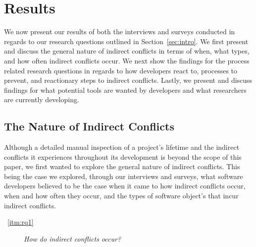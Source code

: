 \documentclass[conference]{IEEEtran}
\begin{document}
\section{Results}
\label{sec:results}

We now present our results of both the interviews and surveys conducted in regards to our research questions
outlined in Section~\ref{sec:intro}. We first present and discuss the general nature of indirect conflicts in
terms of when, what types, and how often indirect conflicts occur. We next show the findings for the process
related research questions in regards to how developers react to, processes to prevent, and reactionary steps
to indirect conflicts. Lastly, we present and discuss findings for what potential tools are wanted by developers
and what researchers are currently developing.

\subsection{The Nature of Indirect Conflicts}

Although a detailed manual inspection of a project's lifetime and the indirect conflicts it experiences throughout
its development is beyond the scope of this paper, we first wanted to explore the general nature of indirect 
conflicts. This being the case we explored, through our interviews and surveys, what software developers believed
to be the case when it came to how indirect conflicts occur, when and how often they occur, and the types of 
software object's that incur indirect conflicts.

\begin{description}
	\item[~\ref{itm:rq1}] \textit{How do indirect conflicts occur?}
\end{description}
\end{document}
